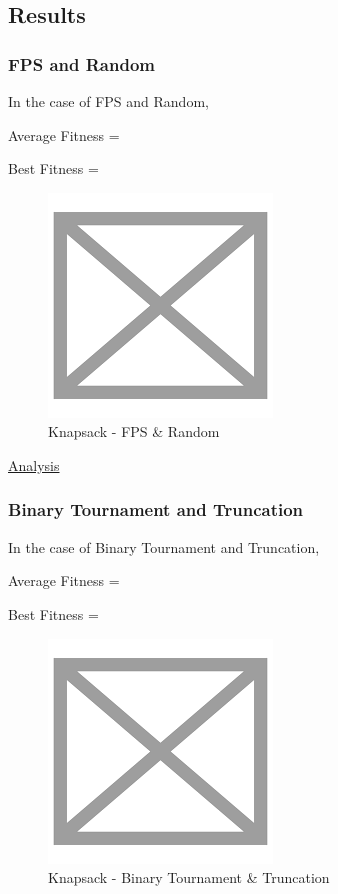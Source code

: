 \documentclass[11pt, letterpaper]{article}
\begin{document}
\subsection {Results} 
\subsubsection {FPS and Random}
In the case of FPS and Random,

Average Fitness = 

Best Fitness = 
\begin{figure}[H]
    \centering
    \includegraphics[scale = 0.6]{images/placeHolder.png}
    \caption {Knapsack - FPS \& Random}
    \label {fig:gcFR}
\end{figure}
\underline{Analysis}
\subsubsection {Binary Tournament and Truncation}
In the case of Binary Tournament and Truncation,

Average Fitness = 

Best Fitness = 
\begin{figure}[h]
    \centering
    \includegraphics[scale = 0.6]{images/placeHolder.png}
    \caption {Knapsack - Binary Tournament \& Truncation}
    \label {fig:gcBT}
\end{figure}
\end{document}
